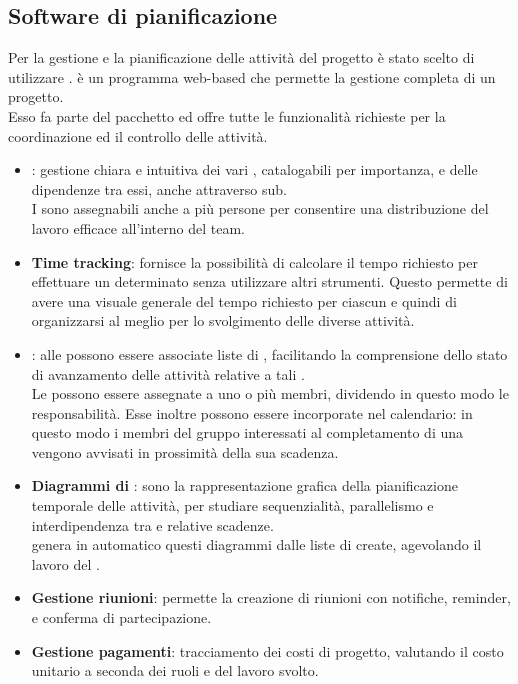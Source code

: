 \subsection{Software di pianificazione} \label{sec:teamwork}
Per la gestione e la pianificazione delle attività del progetto è stato scelto di utilizzare \textbf{}.  è un programma web-based che permette la gestione completa di un progetto.\\
Esso fa parte del pacchetto  ed offre tutte le funzionalità richieste per la coordinazione ed il controllo delle attività.
\begin{itemize}
	\item \textbf{}:
	gestione chiara e intuitiva dei vari , catalogabili per importanza, e delle dipendenze tra essi, anche attraverso sub.\\
	I  sono assegnabili anche a più persone per consentire una distribuzione del lavoro efficace all'interno del team.
	
	\item \textbf{Time tracking}:
	 fornisce la possibilità di calcolare il tempo richiesto per effettuare un determinato  senza utilizzare altri strumenti. Questo permette di avere una visuale generale del tempo richiesto per ciascun  e quindi di organizzarsi al meglio per lo svolgimento delle diverse attività.
	
	\item \textbf{}:
	alle  possono essere associate liste di , facilitando la comprensione dello stato di avanzamento delle attività relative a tali .\\
	Le  possono essere assegnate a uno o più membri, dividendo in questo modo le responsabilità. Esse inoltre possono essere incorporate nel calendario: in questo modo i membri del gruppo interessati al completamento di una  vengono avvisati in prossimità della sua scadenza.
	
	\item \textbf{Diagrammi di }:	
	sono la rappresentazione grafica della pianificazione temporale delle attività, per studiare sequenzialità, parallelismo e interdipendenza tra  e relative scadenze.\\
	 genera in automatico questi diagrammi dalle liste di  create, agevolando il lavoro del \Responsabile.
	
	\item \textbf{Gestione riunioni}:
	 permette la creazione di riunioni con notifiche, reminder, e conferma di partecipazione.
	
	\item \textbf{Gestione pagamenti}:
	tracciamento dei costi di progetto, valutando il costo unitario a seconda dei ruoli e del lavoro svolto.
\end{itemize}

